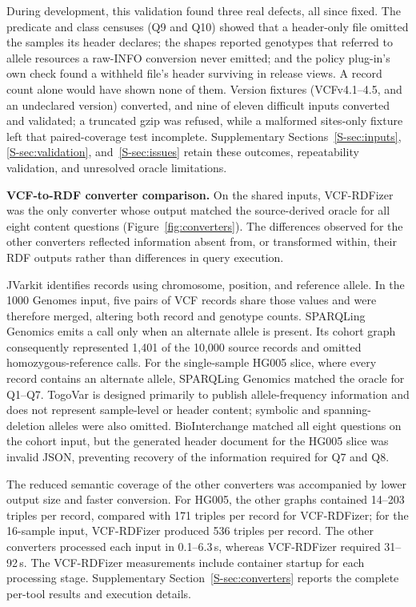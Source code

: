\documentclass[pdflatex,sn-mathphys-num]{sn-jnl}
\begin{document}
During development, this validation found three real defects, all since fixed.
The predicate and class censuses (Q9 and Q10) showed that a header-only file omitted the samples its header declares; the shapes reported genotypes that referred to allele resources a raw-INFO conversion never emitted; and the policy plug-in's own check found a withheld file's header surviving in release views.
A record count alone would have shown none of them.
Version fixtures (VCFv4.1--4.5, and an undeclared version) converted, and nine of eleven difficult inputs converted and validated; a truncated gzip was refused, while a malformed sites-only fixture left that paired-coverage test incomplete.
Supplementary Sections~\ref{S-sec:inputs}, \ref{S-sec:validation}, and~\ref{S-sec:issues} retain these outcomes, repeatability validation, and unresolved oracle limitations.

\textbf{VCF-to-RDF converter comparison.}
On the shared inputs, VCF-RDFizer was the only converter whose output matched the source-derived oracle for all eight content questions (Figure~\ref{fig:converters}).
The differences observed for the other converters reflected information absent from, or transformed within, their RDF outputs rather than differences in query execution.

JVarkit identifies records using chromosome, position, and reference allele.
In the 1000 Genomes input, five pairs of VCF records share those values and were therefore merged, altering both record and genotype counts.
SPARQLing Genomics emits a call only when an alternate allele is present.
Its cohort graph consequently represented 1,401 of the 10,000 source records and omitted homozygous-reference calls.
For the single-sample HG005 slice, where every record contains an alternate allele, SPARQLing Genomics matched the oracle for Q1--Q7.
TogoVar is designed primarily to publish allele-frequency information and does not represent sample-level or header content; symbolic and spanning-deletion alleles were also omitted.
BioInterchange matched all eight questions on the cohort input, but the generated header document for the HG005 slice was invalid JSON, preventing recovery of the information required for Q7 and Q8.

The reduced semantic coverage of the other converters was accompanied by lower output size and faster conversion.
For HG005, the other graphs contained 14--203 triples per record, compared with 171 triples per record for VCF-RDFizer; for the 16-sample input, VCF-RDFizer produced 536 triples per record.
The other converters processed each input in 0.1--6.3\,s, whereas VCF-RDFizer required 31--92\,s.
The VCF-RDFizer measurements include container startup for each processing stage.
Supplementary Section~\ref{S-sec:converters} reports the complete per-tool results and execution details.
\end{document}
